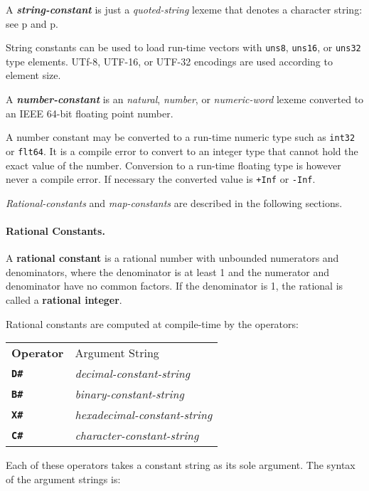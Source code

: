 \documentclass[12pt]{article}
\newcommand{\subsubsubsection}[1]{\paragraph[#1]{#1.}}
\newcommand{\TT}[1]{{\tt \bfseries #1}}
\newcommand{\key}[1]{{\rm \bfseries #1}}
\newcommand{\emkey}[1]{{\em \bfseries #1}}
\newcommand{\pagref}[1]{p\pageref{#1}}
\begin{document}
A \emkey{string-constant} is just a {\em quoted-string} lexeme
that denotes a character string: see
\pagref{QUOTED-STRING} and \pagref{QUOTED-STRING-CONCATENATION}.

String constants can be used to load run-time vectors
with {\tt uns8}, {\tt uns16}, or {\tt uns32} type elements.
UTf-8, UTF-16, or UTF-32 encodings are used according to element
size.

A \emkey{number-constant} is an {\em natural}, {\em number},
or {\em numeric-word} lexeme converted to an IEEE 64-bit floating
point number.

A number constant may be converted to a run-time
numeric type such as {\tt int32} or {\tt flt64}.
It is a compile error to convert to an integer type that cannot
hold the exact value of the number.
Conversion to a run-time floating type is however
never a compile error.  If necessary the converted value is
{\tt +Inf} or {\tt -Inf}.

{\em Rational-constants} and {\em map-constants} are described in the
following sections.


\subsubsubsection{Rational Constants}
\label{RATIONAL-CONSTANTS}

A \key{rational constant} is a rational number with unbounded
numerators and denominators, where the
denominator is at least 1 and the numerator and denominator
have no common factors.  If the denominator is 1, the
rational is called a \key{rational integer}.

Rational constants are computed at compile-time by the operators:
\begin{center}
\begin{tabular}{ll}
\bf Operator	& Argument String
\\[1ex]
\TT{D\#}	& {\em decimal-constant-string} \\
\TT{B\#}	& {\em binary-constant-string} \\
\TT{X\#}	& {\em hexadecimal-constant-string} \\
\TT{C\#}	& {\em character-constant-string} \\
\end{tabular}
\end{center}

Each of these operators takes a constant string as its sole argument.
The syntax of the argument strings is:
\end{document}
